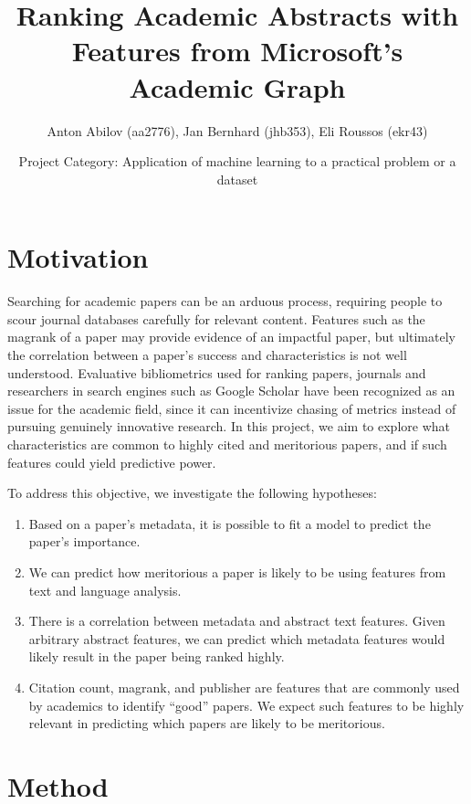 \documentclass[12pt]{extarticle}
\title{Ranking Academic Abstracts with Features from Microsoft’s Academic Graph}
\author{Anton Abilov (aa2776), Jan Bernhard (jhb353), Eli Roussos (ekr43)}
\date{Project Category: Application of machine learning to a practical problem or a dataset}
\begin{document}
\maketitle

\section*{Motivation}

Searching for academic papers can be an arduous process, requiring people to scour journal databases carefully for relevant content. Features such as the magrank of a paper may provide evidence of an impactful paper, but ultimately the correlation between a paper’s success and characteristics is not well understood. Evaluative bibliometrics used for ranking papers, journals and researchers in search engines such as Google Scholar have been recognized as an issue for the academic field, since it can incentivize chasing of metrics instead of pursuing genuinely innovative research\cite{GoogleScholar}. In this project, we aim to explore what characteristics are common to highly cited and meritorious papers, and if such features could yield predictive power. 

\vspace{5mm}

To address this objective, we investigate the following hypotheses:

\begin{enumerate}
  \item Based on a paper’s metadata, it is possible to fit a model to predict the paper’s importance.
  \item We can predict how meritorious a paper is likely to be using features from text and language analysis.
  \item There is a correlation between metadata and abstract text features. Given arbitrary abstract features, we can predict which metadata features would likely result in the paper being ranked highly.
  \item Citation count, magrank, and publisher are features that are commonly used by academics to identify “good” papers. We expect such features to be highly relevant in predicting which papers are likely to be meritorious.
\end{enumerate}

\section*{Method}
\end{document}
